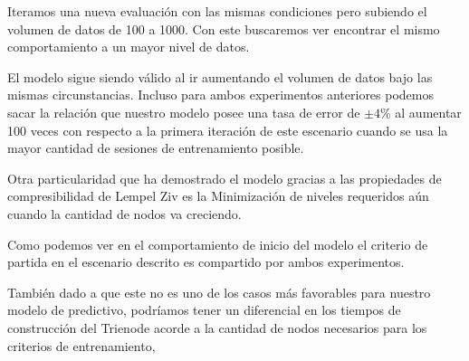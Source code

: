 \begin{enumerate}
	
	Iteramos una nueva evaluación con las mismas condiciones pero subiendo el volumen de datos de 100 a 1000. Con este buscaremos ver encontrar el mismo comportamiento a un mayor nivel de datos.
	


	
	El modelo sigue siendo válido al ir aumentando el volumen de datos bajo las mismas circunstancias. Incluso para ambos experimentos anteriores podemos sacar la relación que nuestro modelo posee una tasa de error de $\pm4\%$ al aumentar 100 veces con respecto a la primera iteración de este escenario cuando se usa la  mayor cantidad de sesiones de entrenamiento posible.


	Otra particularidad que ha demostrado el modelo gracias a las propiedades de compresibilidad de Lempel Ziv\cite{ZivLempel1977} es la Minimización de niveles requeridos aún cuando la cantidad de nodos va creciendo.
	
	
	


	Como podemos ver en el comportamiento de inicio del modelo el criterio de partida en el escenario descrito es compartido por ambos experimentos.

	También dado a que este no es uno de los casos más favorables para nuestro modelo de predictivo, podríamos tener un diferencial en los tiempos de construcción del Trienode acorde a la cantidad de nodos necesarios para los criterios de entrenamiento, 



\end{enumerate}

